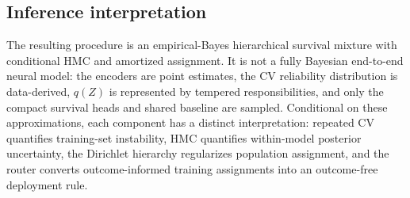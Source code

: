 \subsection{Inference interpretation}

The resulting procedure is an empirical-Bayes hierarchical survival mixture
with conditional HMC and amortized assignment. It is not a fully Bayesian
end-to-end neural model: the encoders are point estimates, the CV reliability
distribution is data-derived, $q(Z)$ is represented by tempered
responsibilities, and only the compact survival heads and shared baseline are
sampled. Conditional on these approximations, each component has a distinct
interpretation: repeated CV quantifies training-set instability, HMC quantifies
within-model posterior uncertainty, the Dirichlet hierarchy regularizes
population assignment, and the router converts outcome-informed training
assignments into an outcome-free deployment rule.
